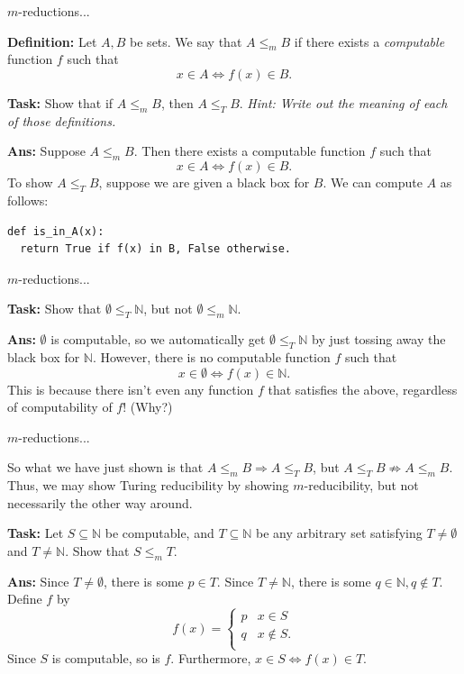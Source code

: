 \documentclass{beamer}
\newcommand{\N}{\mathbb N}
\begin{document}
\begin{frame}[fragile]{$m$-reductions...}

\textbf{Definition:} Let $A, B$ be sets. We say that $A \leq_m B$ if there exists a \textit{computable} function $f$ such that 
$$x \in A \Leftrightarrow f(x) \in B.$$

\textbf{Task:} Show that if $A \leq_m B$, then $A \leq_T B$. \textit{Hint: Write out the meaning of each of those definitions.}

\textbf{Ans:} Suppose $A \leq_m B$. Then there exists a computable function $f$ such that
$$x \in A \Leftrightarrow f(x) \in B.$$
To show $A \leq_T B$, suppose we are given a black box for $B$. We can compute $A$ as follows:
\begin{verbatim}
def is_in_A(x):
  return True if f(x) in B, False otherwise.
\end{verbatim}

\end{frame}

\begin{frame}[fragile]{$m$-reductions...}

\textbf{Task:} Show that $\emptyset \leq_T \N$, but not $\emptyset \leq_m \N$.

\pause

\textbf{Ans:} $\emptyset$ is computable, so we automatically get $\emptyset \leq_T \N$ by just tossing away the black box for $\N$. However, there is no computable function $f$ such that $$x \in \emptyset \Leftrightarrow f(x) \in \N.$$
This is because there isn't even any function $f$ that satisfies the above, regardless of computability of $f$! (Why?)

\end{frame}


\begin{frame}[fragile]{$m$-reductions...}

So what we have just shown is that $A \leq_m B \Rightarrow A \leq_T B$, but $A \leq_T B \not \Rightarrow A \leq_m B$. Thus, we may show Turing reducibility by showing $m$-reducibility, but not necessarily the other way around.

\vspace{2mm}

\pause

\textbf{Task:} Let $S \subseteq \N$ be computable, and $T \subseteq \N$ be any arbitrary set satisfying $T \neq \emptyset$ and $T \neq \N$. Show that $S \leq_m T$.

\pause

\vspace{2mm}

\textbf{Ans:} Since $T \neq \emptyset$, there is some $p \in T$. Since $T \neq \N$, there is some $q \in \N, q \notin T$. Define $f$ by
$$f(x) = \begin{cases}
p & x \in S\\
q & x \notin S.\\
\end{cases}$$
Since $S$ is computable, so is $f$. Furthermore, $x \in S \Leftrightarrow f(x) \in T$.

\end{frame}
\end{document}
